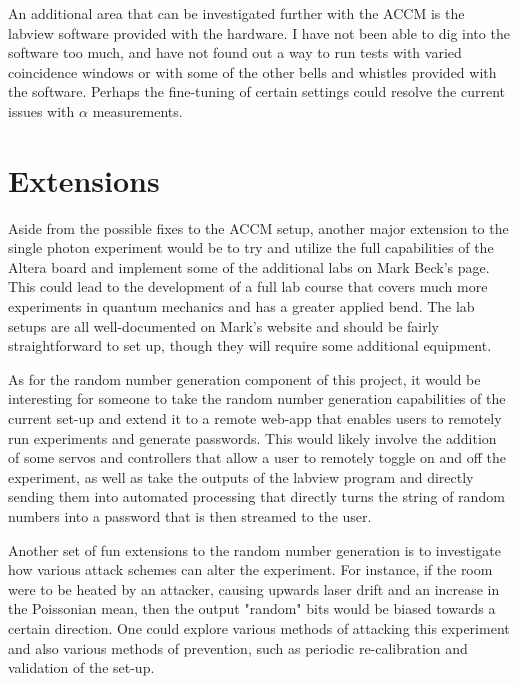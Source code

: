 \documentclass[letterpaper, 11 pt]{article}
\begin{document}
An additional area that can be investigated further with the ACCM is the labview software provided
with the hardware. I have not been able to dig into the software too much, and have not found out a way
to run tests with varied coincidence windows or with some of the other bells and whistles provided
with the software. Perhaps the fine-tuning of certain settings could resolve the current issues
with $\alpha$ measurements.

\section{Extensions}

Aside from the possible fixes to the ACCM setup, another major extension to the single photon experiment
would be to try and utilize the full capabilities of the Altera board and implement some of the additional
labs on Mark Beck's page. This could lead to the development of a full lab course that covers much more
experiments in quantum mechanics and has a greater applied bend. The lab setups are all well-documented on Mark's
website and should be fairly straightforward to set up, though they will require some additional
equipment.

As for the random number generation component of this project, it would be interesting
for someone to take the random number generation capabilities of the current set-up and extend it
to a remote web-app that enables users to remotely run experiments and generate passwords.
This would likely involve the addition of some servos and controllers that allow a user to remotely
toggle on and off the experiment, as well as take the outputs of the labview program and directly
sending them into automated processing that directly turns the string of random numbers into a password that
is then streamed to the user.

Another set of fun extensions to the random number generation is to investigate how various
attack schemes can alter the experiment. For instance, if the room were to be heated by an attacker,
causing upwards laser drift and an increase in the Poissonian mean, then the output "random" bits
would be biased towards a certain direction. One could explore various methods of attacking this experiment
and also various methods of prevention, such as periodic re-calibration and validation of the set-up.


\end{document}
